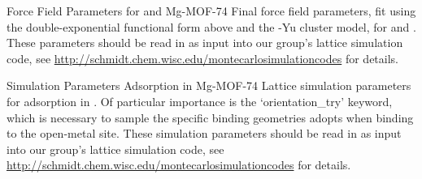\begin{subappendices}
\begin{section}{Force Field Parameters for {\co} and Mg-MOF-74}
\label{sec:lmoeda-params}
Final force field parameters, fit using the double-exponential functional form
above and the \mgmof-Yu cluster model, for \co and \mgmof. 
These parameters
should be read in as input into our group's lattice simulation code, see 
\url{http://schmidt.chem.wisc.edu/montecarlosimulationcodes} for details.

\tiny

\normalsize

\end{section}
\clearpage
\begin{section}{Simulation Parameters {\co} Adsorption in Mg-MOF-74}
Lattice simulation parameters for \co adsorption in \mgmof. Of particular
importance is the `orientation\_try' keyword, which is necessary to sample the
specific binding geometries \co adopts when binding to the open-metal site.
These simulation parameters
should be read in as input into our group's lattice simulation code, see 
\url{http://schmidt.chem.wisc.edu/montecarlosimulationcodes} for details.

\tiny
%

\normalsize

\end{section}

\end{subappendices}
